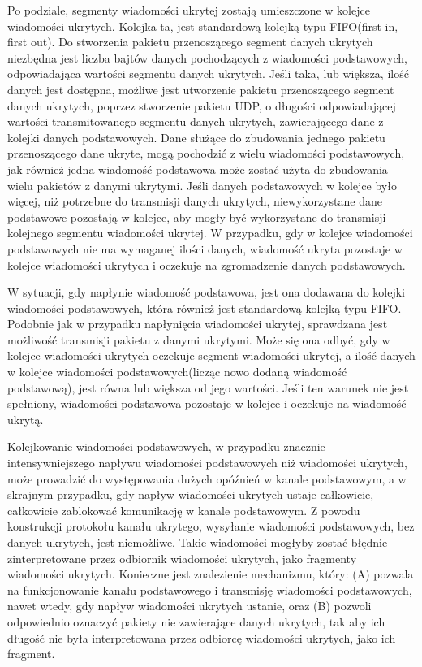 \documentclass[a4paper, twoside, 12pt]{report}
\begin{document}
    Po podziale, segmenty wiadomości ukrytej zostają umieszczone w kolejce wiadomości
    ukrytych. Kolejka ta, jest standardową kolejką typu FIFO(first in, first out).
    Do stworzenia pakietu przenoszącego segment danych ukrytych niezbędna jest
    liczba bajtów danych pochodzących z wiadomości podstawowych, odpowiadająca
    wartości segmentu danych ukrytych. Jeśli taka, lub większa, ilość danych jest dostępna,
    możliwe jest utworzenie pakietu przenoszącego segment danych ukrytych, poprzez
    stworzenie pakietu UDP, o długości odpowiadającej wartości transmitowanego segmentu danych
    ukrytych, zawierającego dane z kolejki danych podstawowych. Dane służące do zbudowania
    jednego pakietu przenoszącego dane ukryte, mogą pochodzić z wielu wiadomości
    podstawowych, jak również jedna wiadomość podstawowa może zostać użyta do zbudowania
    wielu pakietów z danymi ukrytymi. Jeśli danych podstawowych
    w kolejce było więcej, niż potrzebne do transmisji danych ukrytych, niewykorzystane
    dane podstawowe pozostają w kolejce, aby mogły być wykorzystane do transmisji
    kolejnego segmentu wiadomości ukrytej.
    W przypadku, gdy w kolejce wiadomości podstawowych nie ma wymaganej ilości
    danych, wiadomość ukryta pozostaje w kolejce wiadomości ukrytych i oczekuje
    na zgromadzenie danych podstawowych.

    W sytuacji, gdy napłynie wiadomość podstawowa, jest ona dodawana do kolejki
    wiadomości podstawowych, która również jest standardową kolejką typu FIFO.
    Podobnie jak w przypadku napłynięcia wiadomości ukrytej, sprawdzana jest możliwość
    transmisji pakietu z danymi ukrytymi. Może się ona odbyć, gdy w kolejce wiadomości
    ukrytych oczekuje segment wiadomości ukrytej, a ilość danych w kolejce wiadomości
    podstawowych(licząc nowo dodaną wiadomość podstawową), jest równa lub większa
    od jego wartości. Jeśli ten warunek nie jest spełniony, wiadomości podstawowa
    pozostaje w kolejce i oczekuje na wiadomość ukrytą.

    Kolejkowanie wiadomości podstawowych, w przypadku znacznie intensywniejszego
    napływu wiadomości podstawowych niż wiadomości ukrytych, może prowadzić do
    występowania dużych opóźnień w kanale podstawowym, a w skrajnym przypadku,
    gdy napływ wiadomości ukrytych ustaje całkowicie, całkowicie zablokować
    komunikację w kanale podstawowym. Z powodu konstrukcji protokołu kanału
    ukrytego, wysyłanie wiadomości podstawowych, bez danych ukrytych, jest niemożliwe.
    Takie wiadomości mogłyby zostać błędnie zinterpretowane przez odbiornik wiadomości
    ukrytych, jako fragmenty wiadomości ukrytych. Konieczne jest znalezienie mechanizmu,
    który: (A) pozwala na funkcjonowanie kanału podstawowego i transmisję wiadomości
    podstawowych, nawet wtedy, gdy napływ wiadomości ukrytych ustanie, oraz (B)
    pozwoli odpowiednio oznaczyć pakiety nie zawierające danych ukrytych, tak aby ich długość
    nie była interpretowana przez odbiorcę wiadomości ukrytych, jako ich fragment.
\end{document}
